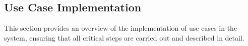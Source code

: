\documentclass{article}
\makeatletter
\newcommand\subsubsubsection{\@startsection{paragraph}{4}{\z@}{-2.5ex\@plus -1ex \@minus -.25ex}{1.25ex \@plus .25ex}{\normalfont\normalsize\bfseries}}
\makeatother
\begin{document}
\subsection{Use Case Implementation}
This section provides an overview of the implementation of use cases in the system, ensuring that
all critical steps are carried out and described in detail.

    
    
    






\end{document}
